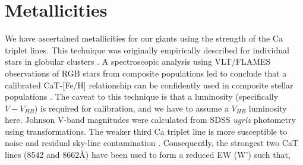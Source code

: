 \documentclass[preprint2]{aastex}
\begin{document}
\section{Metallicities}
\label{sec:metallicities}

We have ascertained metallicities for our giants using the strength of the Ca triplet lines. This technique was originally empirically described for individual stars in globular  clusters \citep{Armandroff;Da-Costa_1991}. A spectroscopic analysis using VLT/FLAMES observations of RGB stars from composite populations led \citet{Battaglia;et-al_2008} to conclude that a calibrated CaT-[Fe/H] relationship can be confidently used in composite stellar populations \citep[see also][]{Rutledge;Hesser;Stetson_1997, Starkenburg;et-al_2010}. The caveat to this technique is that a luminosity (specifically $V - V_{HB}$) is required for calibration, and we have to assume a $V_{HB}$ luminosity here. Johnson V-band magnitudes were calculated from SDSS \textit{ugriz} photometry using \citet{Jester;et-al_2005} transformations. The weaker third Ca triplet line is more susceptible to noise and residual sky-line contamination \citep{Tolstoy;et-al_2001,Battaglia;et-al_2008}. Consequently, the strongest two CaT lines (8542 and 8662\AA) have been used to form a reduced EW (W') such that,

\end{document}
